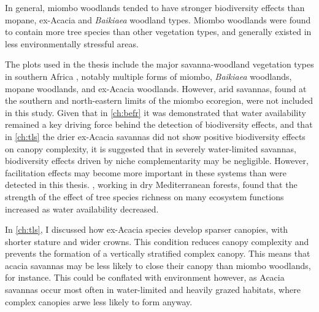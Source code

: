 \begin{refsection}
In general, miombo woodlands tended to have stronger biodiversity effects than mopane, ex-Acacia and \textit{Baikiaea} woodland types. Miombo woodlands were found to contain more tree species than other vegetation types, and generally existed in less environmentally stressful areas. 

The plots used in the thesis include the major savanna-woodland vegetation types in southern Africa \citep{}, notably multiple forms of miombo, \textit{Baikiaea} woodlands, mopane woodlands, and ex-Acacia woodlands. However, arid savannas, found at the southern and north-eastern limits of the miombo ecoregion, were not included in this study. Given that in \autoref{ch:befr} it was demonstrated that water availability remained a key driving force behind the detection of biodiversity effects, and that in \autoref{ch:tls} the drier ex-Acacia savannas did not show positive biodiversity effects on canopy complexity, it is suggested that in severely water-limited savannas, biodiversity effects driven by niche complementarity may be negligible. However, facilitation effects may become more important in these systems than were detected in this thesis. \citet{Ratcliffe2017}, working in dry Mediterranean forests, found that the strength of the effect of tree species richness on many ecosystem functions increased as water availability decreased. 

In \autoref{ch:tls}, I discussed how ex-Acacia species develop sparser canopies, with shorter stature and wider crowns. This condition reduces canopy complexity and prevents the formation of a vertically stratified complex canopy. This means that acacia savannas may be less likely to close their canopy than miombo woodlands, for instance. This could be conflated with environment however, as Acacia savannas occur most often in water-limited and heavily grazed habitats, where complex canopies arwe less likely to form anyway.


\end{refsection}
